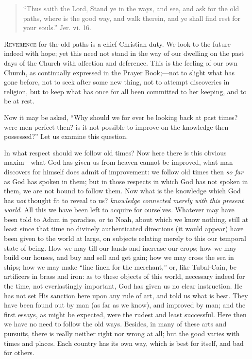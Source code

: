 
\begin{quote}

``Thus saith the Lord, Stand ye in the ways, and see, and ask
for the old paths, where is the good way, and walk therein, and ye
shall find rest for your souls.'' Jer. vi. 16.

\end{quote}

R\textsc{everence} for the old paths is a chief Christian duty. We look to
the future indeed with hope; yet this need not stand in the way of our
dwelling on the past days of the Church with affection and deference.
This is the feeling of our own Church, as continually expressed in the
Prayer Book;—not to slight what has gone before, not to seek after
some new thing, not to attempt discoveries in religion, but to keep
what has once for all been committed to her keeping, and to be at
rest.

Now it may be asked, ``Why should we for ever be looking back
at past times? were men perfect then? is it not possible to improve on
the knowledge then possessed?'' Let us examine this question.

In what respect should we follow old times? Now here there is this
obvious maxim—what God has given us from heaven cannot be improved,
what man discovers for himself does admit of improvement: we follow
old times then \emph{so far} as God has spoken in them; but in those
respects in which God has not spoken in them, we are not bound to
follow them. Now what is the knowledge which God has \emph{not}
thought fit to reveal to us? \emph{knowledge connected merely with this
present world}. All this we have been left to acquire for
ourselves. Whatever may have been told to Adam in paradise, or to
Noah, about which we know nothing, still at least since that time no
divinely authenticated directions (it would appear) have been given to
the world at large, on subjects relating merely to this our temporal
state of being. How we may till our lands and increase our crops; how
we may build our houses, and buy and sell and get gain; how we may
cross the sea in ships; how we may make ``fine linen for the
merchant,'' or, like Tubal-Cain, be artificers in brass and iron:
as to these objects of this world, necessary indeed for the time, not
everlastingly important, God has given us no clear instruction. He has
not set His sanction here upon any rule of art, and told us what is
best. They have been found out by man (as far as we know), and
improved by man; and the first essays, as might be expected, were the
rudest and least successful. Here then we have no need to follow the
old ways. Besides, in many of these arts and pursuits, there is really
neither right nor wrong at all; but the good varies with times and
places. Each country has its own way, which is best for itself, and
bad for others.

